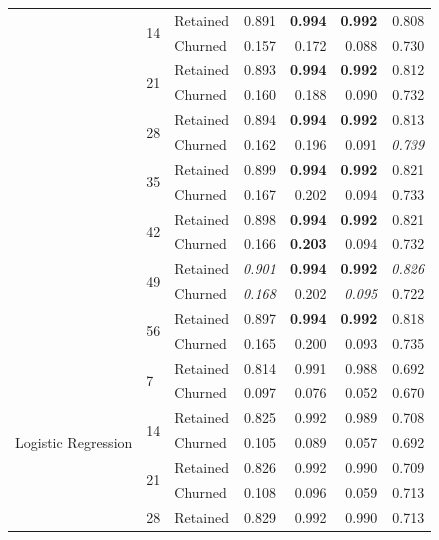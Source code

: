 \documentclass{kththesis}
\begin{document}
\begin{table}
\begin{tabular}{lllrrrr}
\cline{2-7}
     & \multirow{2}{*}{14} & Retained &  0.891 &  \textbf{0.994} &   \textbf{0.992} &  0.808 \\
     &   & Churned &  0.157 &  0.172 &   0.088 &  0.730 \\
\cline{2-7}
     & \multirow{2}{*}{21} & Retained &  0.893 &  \textbf{0.994} &   \textbf{0.992} &  0.812 \\
     &   & Churned &  0.160 &  0.188 &   0.090 &  0.732 \\
\cline{2-7}
     & \multirow{2}{*}{28} & Retained &  0.894 &  \textbf{0.994} &   \textbf{0.992} &  0.813 \\
     &   & Churned &  0.162 &  0.196 &   0.091 &  \textit{0.739} \\
\cline{2-7}
     & \multirow{2}{*}{35} & Retained &  0.899 &  \textbf{0.994} &   \textbf{0.992} &  0.821 \\
     &   & Churned &  0.167 &  0.202 &   0.094 &  0.733 \\
\cline{2-7}
     & \multirow{2}{*}{42} & Retained &  0.898 &  \textbf{0.994} &   \textbf{0.992} &  0.821 \\
     &   & Churned &  0.166 &  \textbf{0.203} &   0.094 &  0.732 \\
\cline{2-7}
     & \multirow{2}{*}{49} & Retained &  \textit{0.901} &  \textbf{0.994} &   \textbf{0.992} &  \textit{0.826} \\
     &   & Churned &  \textit{0.168} &  0.202 &   \textit{0.095} &  0.722 \\
\cline{2-7}
     & \multirow{2}{*}{56} & Retained &  0.897 &  \textbf{0.994} &   \textbf{0.992} &  0.818 \\
     &   & Churned &  0.165 &  0.200 &   0.093 &  0.735 \\
\cline{1-7}
\cline{2-7}
\multirow{16}{*}{Logistic Regression} & \multirow{2}{*}{7} & Retained &  0.814 &  0.991 &   0.988 &  0.692 \\
     &   & Churned &  0.097 &  0.076 &   0.052 &  0.670 \\
\cline{2-7}
     & \multirow{2}{*}{14} & Retained &  0.825 &  0.992 &   0.989 &  0.708 \\
     &   & Churned &  0.105 &  0.089 &   0.057 &  0.692 \\
\cline{2-7}
     & \multirow{2}{*}{21} & Retained &  0.826 &  0.992 &   0.990 &  0.709 \\
     &   & Churned &  0.108 &  0.096 &   0.059 &  0.713 \\
\cline{2-7}
     & \multirow{2}{*}{28} & Retained &  0.829 &  0.992 &   0.990 &  0.713 \\

\end{tabular}
\end{table}
\end{document}
